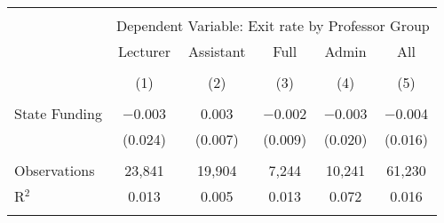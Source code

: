 
\begin{tabular}{@{\extracolsep{5pt}}lccccc} 
\\[-1.8ex]\hline 
\hline \\[-1.8ex] 
 & \multicolumn{5}{c}{Dependent Variable: Exit rate by Professor Group} \\ 
\cline{2-6} 
 & Lecturer & Assistant & Full & Admin & All \\ 
\\[-1.8ex] & (1) & (2) & (3) & (4) & (5)\\ 
\hline \\[-1.8ex] 
 State Funding & $-$0.003 & 0.003 & $-$0.002 & $-$0.003 & $-$0.004 \\ 
  & (0.024) & (0.007) & (0.009) & (0.020) & (0.016) \\ 
 \hline \\[-1.8ex] 
Observations & 23,841 & 19,904 & 7,244 & 10,241 & 61,230 \\ 
R$^{2}$ & 0.013 & 0.005 & 0.013 & 0.072 & 0.016 \\ 
\hline 
\hline \\[-1.8ex] 
\end{tabular} 

